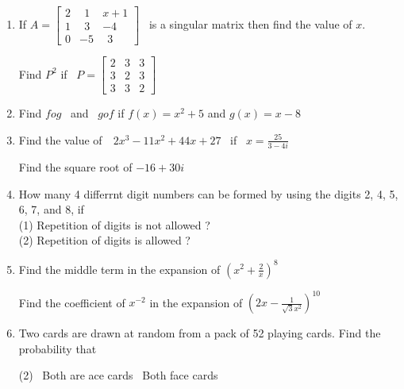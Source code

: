 \documentclass[16pt,a4paper]{article}
\begin{document}
\begin{enumerate}
\item If \( A = \left[ 
\begin{array}{ccc} 
2&\ \ 1&x+1 \\ 1&\ \ 3&-4 \\ 0&-5&\ \ 3
\end{array} 
\right] \) \ is a singular matrix then find the value of $x$.

Find $P^2$ if \
\( P = \left[ 
\begin{array}{ccc} 
2&3&3 \\ 3&2&3 \\ 3&3&2
\end{array} 
\right] \)

\item Find $fog$ \ and \ $gof$ if $f(x) = x^2 + 5$ and $g(x) = x - 8 $

\item Find the value of\ \ $2x^3 - 11x^2 + 44x + 27$ \ if \ $x = \frac {25}{3 - 4i}$

Find the square root of $-16 + 30i$

\item How many 4 differrnt digit numbers can be formed by using the digits 2, 4, 5, 6, 7, and 8, if \\
(1) Repetition of digits is not allowed ?\\
(2) Repetition of digits is allowed ?

\item Find the middle term in the expansion of $\left(x^2 + \frac {2}{x} \right)^8$


Find the coefficient of $x^{-2}$ in the expansion of $\left(2x - \frac {1}{\sqrt 3 x^2} \right)^{10}$

\item Two cards are drawn at random from a pack of 52 playing cards. Find the probability that  
\begin{tasks}(2)
\task\ Both are ace cards
\task\ Both face cards
\end{tasks}



\end{enumerate}
\end{document}
